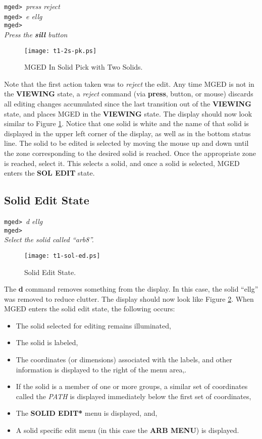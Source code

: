 \noindent
{\tt mged> }{\em press reject}\\
{\tt mged> }{\em e ellg}\\
{\tt mged> }\\
{\em Press the {\bf sill} button}\\

\begin{figure}
\centering \texttt{[image: t1-2s-pk.ps]}
\caption{MGED In Solid Pick with Two Solids.}
\label{t1-2s-pk}
\end{figure}

Note that the first action taken was to {\sl reject} the edit.  Any time MGED
is not in the {\bf VIEWING} state, a {\sl reject} command (via
{\bf press}, button, or mouse) discards all editing changes accumulated
since the last transition out of the {\bf VIEWING} state, and places
MGED in the {\bf VIEWING} state.
The display should now look similar to Figure \ref{t1-2s-pk}.
Notice that one solid is white and
the name of that solid is displayed in the upper left corner of the
display, as well as in the bottom status line. The solid to be edited is
selected by moving the mouse up and down until the zone corresponding to
the desired solid is reached. Once the appropriate zone is reached, select it.
This selects a solid, and once a solid is selected,
MGED enters the {\bf SOL EDIT} state.

\subsection{Solid Edit State}

\noindent
{\tt mged> }{\em d ellg}\\
{\tt mged> }\\
{\em Select the solid called ``arb8''.}\\

\begin{figure}
\centering \texttt{[image: t1-sol-ed.ps]}
\caption{Solid Edit State.}
\label{t1-sol-ed}
\end{figure}

The {\bf d} command removes something from the display.  In this
case, the solid ``ellg'' was removed to reduce clutter.
The display should now look like Figure \ref{t1-sol-ed}.
When MGED enters the solid edit state, the following occurs:
\begin{itemize}
\item The solid selected for editing remains illuminated,
\item The solid is labeled,
\item The coordinates (or dimensions) associated with the labels,
and other information is displayed to the right of the menu area,.
\item If the solid is a member of one or more groups, a similar set
of coordinates called the {\sl PATH} is displayed immediately below
the first set of coordinates,
\item The {\bf *SOLID EDIT*} menu is displayed, and,
\item A solid specific edit menu (in this case the {\bf ARB MENU})
is displayed.
\end{itemize}

